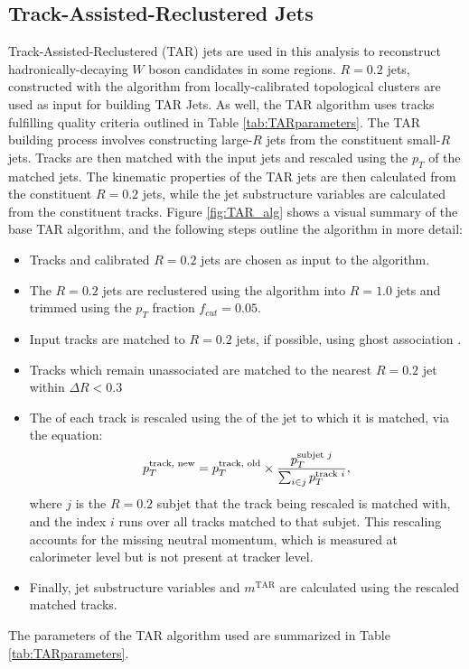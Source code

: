 \subsection{Track-Assisted-Reclustered Jets}
\label{ap:TARjet_object_defs}
Track-Assisted-Reclustered (TAR) jets \cite{TAR} are used in this analysis to reconstruct hadronically-decaying $W$ boson candidates in some regions. $R=0.2$ jets, constructed with the \akt algorithm \cite{antikt} from locally-calibrated topological clusters \cite{TopoClusters} are used as input for building TAR Jets. As well, the TAR algorithm uses tracks fulfilling quality criteria outlined in Table \ref{tab:TARparameters}. The TAR building process involves constructing large-$R$ jets from the constituent small-$R$ jets. Tracks are then matched with the input jets and rescaled using the $p_T$ of the matched jets. The kinematic properties of the TAR jets are then calculated from the constituent $R=0.2$ jets, while the jet substructure variables are calculated from the constituent tracks. Figure \ref{fig:TAR_alg} shows a visual summary of the base TAR algorithm, and
the following steps outline the algorithm in more detail:
\begin{itemize}
  \item Tracks and calibrated \akt $R=0.2$ jets are chosen as input to the algorithm.
  \item The \akt $R=0.2$ jets are reclustered using the \akt algorithm into $R=1.0$ jets and trimmed using the $p_T$ fraction \(f_{cut}=0.05\).
  \item Input tracks are matched to $R=0.2$ jets, if possible, using ghost association \cite{Ghost}.
  \item Tracks which remain unassociated are matched to the nearest \akt $R=0.2$ jet within $\Delta R<0.3$
  \item The \pT of each track is rescaled using the \pT of the jet to which it is matched, via the equation:
  \begin{equation}
  p_T^{\text{track, new}} = p_T^{\text{track, old}}\times \frac{p_T^{\text{subjet $j$}}}{\sum_{i \in j} p_T^{\text{track $i$}}} ,
  \label{eq:TAR_rescale}
  \end{equation}  where $j$ is the $R=0.2$ subjet that the track being rescaled is matched with, and the index $i$ runs over all tracks matched to that subjet. This rescaling accounts for the missing neutral momentum, which is measured at calorimeter level but is not present at tracker level.
  \item Finally, jet substructure variables and $m^\text{TAR}$ are calculated using the rescaled matched tracks.
\end{itemize}
The parameters of the TAR algorithm used are summarized in Table \ref{tab:TARparameters}. \\

